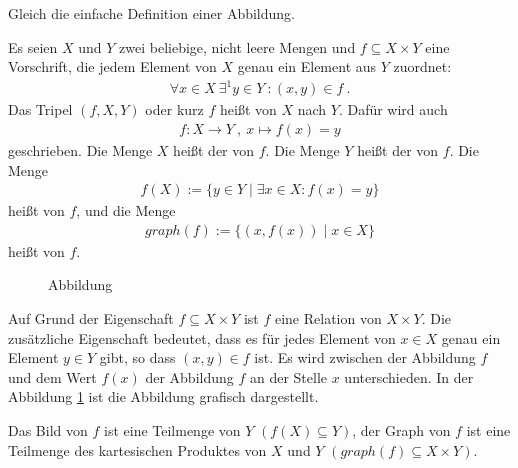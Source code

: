 \begin{Unit}
Gleich die einfache Definition einer Abbildung.

\begin{Definition}
  Es seien $X$ und $Y$ zwei beliebige, nicht leere Mengen und $f \subseteq X 
  \times Y$ eine Vorschrift, die jedem Element von $X$ genau ein Element aus 
  $Y$ zuordnet:
  \begin{align}
    \forall x \in X\ \exists^1 y \in Y\ : (x, y) \in f \ .
  \end{align}
  Das Tripel $(f,X,Y)$ oder kurz $f$ heißt  von $X$ nach 
  $Y$. Dafür wird auch 
  \begin{align}
    f:X \rightarrow Y\ ,\ x \mapsto f(x) = y 
  \end{align}
  geschrieben.
  Die Menge $X$ heißt der  von $f$. Die Menge 
  $Y$ heißt der  von $f$. Die Menge 
  \begin{align}
    f(X) := \{y \in Y \mid \exists x \in X: f(x) = y\}
  \end{align} 
  heißt  von $f$, und die Menge 
  \begin{align}
    graph(f) := \{(x, f(x)) \mid x \in X\}
  \end{align} heißt  von $f$.
\end{Definition}

\begin{figure}[htbp]
\begin{center}
  \caption{Abbildung}
  \label{abb:abb:Abbildung}
\end{center}
\end{figure}

Auf Grund der Eigenschaft $f \subseteq X \times Y$ ist $f$ eine Relation von 
$X \times Y$. Die zusätzliche Eigenschaft bedeutet, dass es für jedes Element 
von $x \in X$ genau ein Element $y \in Y$ gibt, so dass $(x,y) \in f$ ist. Es 
wird zwischen der Abbildung $f$ und dem Wert $f(x)$ der Abbildung $f$ an der 
Stelle $x$ unterschieden. In der Abbildung \ref{abb:abb:Abbildung} ist die 
Abbildung grafisch dargestellt.

Das Bild von $f$ ist eine Teilmenge von $Y$ $(f(X) \subseteq Y)$, der Graph 
von $f$ ist eine Teilmenge des kartesischen Produktes von $X$ und $Y$ 
$(graph(f) \subseteq X \times Y)$.
\end{Unit} 

